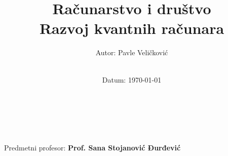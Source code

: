 \title{\Large  Računarstvo i društvo  \\[0.5cm]
        \bf\Large Razvoj kvantnih računara}
\author{\large Autor: Pavle Veličković\\ \ \\}
\date{\large Datum: \today}

\makeatletter
    \begin{titlepage}
        \begin{center}
	    {\ \\ \ \\}
        \vbox{}\vspace{5cm}
            {\@title }\\[3cm] 
            {\@author}
            {\large Predmetni profesor: \bf Prof. Sana Stojanović Đurđević\\  \ \\}
            {\@date\\}

        \end{center}
    \end{titlepage}
\makeatother